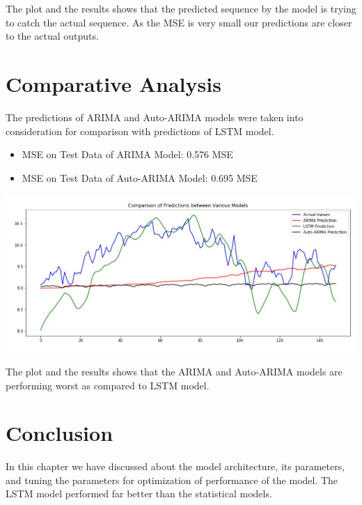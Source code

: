 The plot and the results shows that the predicted sequence by the model is trying to catch the actual sequence. As the MSE is very small our predictions are closer to the actual outputs.


\section{Comparative Analysis} 

The predictions of ARIMA and Auto-ARIMA models were taken into consideration for comparison with predictions of LSTM model. 
\begin{itemize}
\item MSE on Test Data of ARIMA Model:  0.576 MSE
\item MSE on Test Data of Auto-ARIMA Model:  0.695 MSE
\end{itemize}
				\begin{center}
				\includegraphics[width=\linewidth]{figures/Comp-ARIMA-LSTM.jpg}	
				\label{fig: Comparison of Prediction between ARIMA, Auto-ARIMAl  and LSTM Model with Actual Values}
				\end{center}

The plot and the results shows that the ARIMA and Auto-ARIMA models are performing worst as compared to LSTM model.
\section{Conclusion }

In this chapter we have discussed about the model architecture, its parameters, and tuning the parameters for optimization of performance of the model. The LSTM model performed far better than the statistical models.
